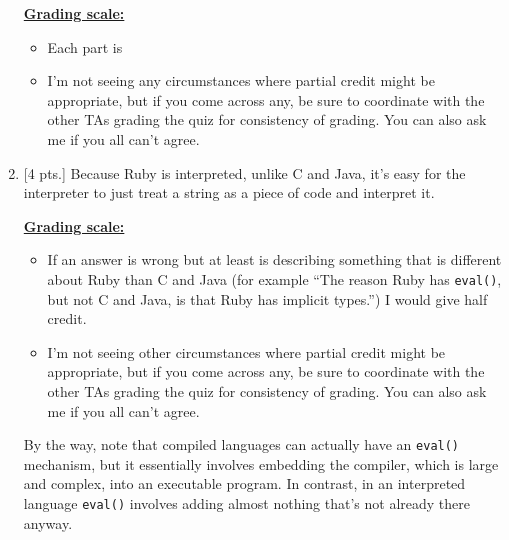 \documentclass[11pt,fleqn]{article}
\begin{document}
\begin{enumerate}
\begin{info}{\textbf{\underline{Grading scale:}}}
            \begin{itemize}

              \addtolength{\itemsep}{2mm}

              \item Each part is 

              \item I'm not seeing any circumstances where partial credit
                    might be appropriate, but if you come across any, be
                    sure to coordinate with the other TAs grading the quiz
                    for consistency of grading.  You can also ask me if you
                    all can't agree.

            \end{itemize}

          \end{info}

          \enlargethispage{10mm}

    \item {[4 pts.]} Because Ruby is interpreted, unlike C and Java, it's
          easy for the interpreter to just treat a string as a piece of code
          and interpret it.

          \vspace{-3.5mm}

          \begin{info}{\textbf{\underline{Grading scale:}}}

            \begin{itemize}

              \addtolength{\itemsep}{2mm}

              \item If an answer is wrong but at least is describing
                    something that is different about Ruby than C and Java
                    (for example ``The reason Ruby has \texttt{eval()}, but
                    not C and Java, is that Ruby has implicit types.'') I
                    would give half credit.

              \item I'm not seeing other circumstances where partial credit
                    might be appropriate, but if you come across any, be
                    sure to coordinate with the other TAs grading the quiz
                    for consistency of grading.  You can also ask me if you
                    all can't agree.

            \end{itemize}

            \smallskip

            By the way, note that compiled languages can actually have an
            \texttt{eval()} mechanism, but it essentially involves embedding
            the compiler, which is large and complex, into an executable
            program.  In contrast, in an interpreted language
            \texttt{eval()} involves adding almost nothing that's not
            already there anyway.

          \end{info}

  \end{enumerate}
\end{document}
